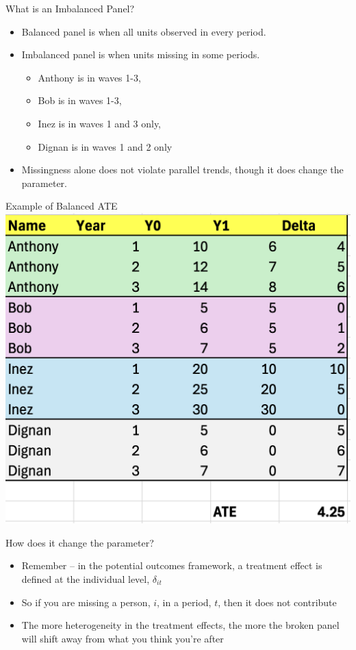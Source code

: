 \documentclass{beamer}
\begin{document}
\begin{frame}{What is an Imbalanced Panel?}
  \begin{itemize}
    \item Balanced panel is when all units observed in every period.
    \item Imbalanced panel is when units missing in some periods.
		\begin{itemize}
		\item Anthony is in waves 1-3,
		\item Bob is in waves 1-3,
		\item Inez is in waves 1 and 3 only,
		\item Dignan is in waves 1 and 2 only
		\end{itemize}
    \item Missingness alone does not violate parallel trends, though it does change the parameter.
  \end{itemize}
\end{frame}

\begin{frame}{Example of Balanced ATE}
  \centering
  \includegraphics[height=0.85\textheight,keepaspectratio]{./lecture_includes/balanced.png}
\end{frame}


\begin{frame}{How does it change the parameter?}

\begin{itemize}
\item Remember -- in the potential outcomes framework, a treatment effect is defined at the individual level, $\delta_{it}$
\item So if you are missing a person, $i$,  in a period, $t$, then it does not contribute
\item The more heterogeneity in the treatment effects, the more the broken panel will shift away from what you think you're after
\end{itemize}

\end{frame}
\end{document}
